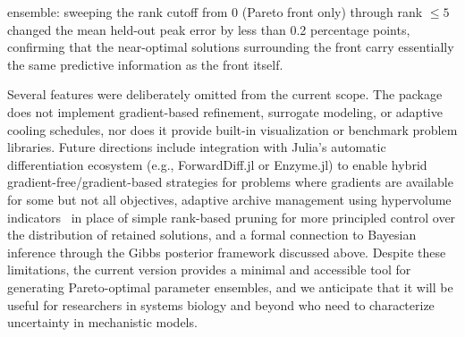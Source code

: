 \documentclass[12pt]{article}
\begin{document}
ensemble: sweeping the rank cutoff from 0 (Pareto front only) through rank $\leq 5$ changed the mean held-out peak error by less than 0.2 percentage points, confirming that the near-optimal solutions surrounding the front carry essentially the same predictive information as the front itself.

Several features were deliberately omitted from the current scope. The package does not implement gradient-based refinement, surrogate modeling, or adaptive cooling schedules, nor does it provide built-in visualization or benchmark problem libraries. Future directions include integration with Julia's automatic differentiation ecosystem (e.g., ForwardDiff.jl or Enzyme.jl) to enable hybrid gradient-free/gradient-based strategies for problems where gradients are available for some but not all objectives, adaptive archive management using hypervolume indicators~\cite{Zitzler2003} in place of simple rank-based pruning for more principled control over the distribution of retained solutions, and a formal connection to Bayesian inference through the Gibbs posterior framework discussed above. Despite these limitations, the current version provides a minimal and accessible tool for generating Pareto-optimal parameter ensembles, and we anticipate that it will be useful for researchers in systems biology and beyond who need to characterize uncertainty in mechanistic models.

\end{document}
